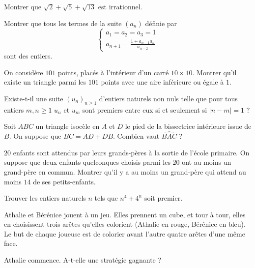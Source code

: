 \begin{exo}{}
Montrer que $\sqrt{2}+\sqrt{5}+\sqrt{13}$ est irrationnel.
\end{exo}

\begin{exo}{}
Montrer que tous les termes de la suite $\left(a_{n}\right)$ définie par 
\[\begin{cases}
a_{1}=a_{2}=a_{3}=1\\
a_{n+1}=\frac{1+a_{n-1}a_{n}}{a_{n-2}}
\end{cases}\]
sont des entiers. 
\end{exo}

\begin{exo}{}
On considère $101$ points, placés à l'intérieur d'un carré $10\times10$. Montrer qu'il existe un triangle parmi les $101$ points avec une aire inférieure ou égale à $1$.
\end{exo}

\begin{exo}{}
 Existe-t-il une
suite $\left(u_{n}\right)_{n \geq 1}$ d'entiers naturels non nuls telle que pour tous entiers $m,n \geq 1$
$u_{n}$ et $u_{m}$ sont premiers entre eux si et seulement si $\left|n-m\right|=1$
?
\end{exo}

\begin{exo}{} 
Soit $ABC$ un triangle isocèle en $A$ et $D$ le pied de la bissectrice intérieure issue de $B$. On suppose que $BC=AD+DB$. Combien vaut $\widehat{BAC}$ ?
\end{exo}

\begin{exo}{}
$20$ enfants sont attendus par leurs grands-pères à la sortie de l’école primaire.
On suppose que deux enfants quelconques choisis parmi les $20$ ont au moins un grand-père en commun.
Montrer qu’il y a au moins un grand-père qui attend au moins $14$ de ses petits-enfants.
\end{exo}

\begin{exo}{}
Trouver les entiers naturels $n$ tels que $n^4+4^n$ soit premier. 
\end{exo}

\begin{exo}{}
Athalie et Bérénice jouent à un jeu. Elles prennent un cube, et tour à tour, elles en choisissent trois arêtes qu'elles colorient (Athalie en rouge, Bérénice en bleu). Le but de chaque joueuse est de colorier avant l'autre quatre arêtes d'une même face.

Athalie commence. A-t-elle une stratégie gagnante ?
\end{exo}


